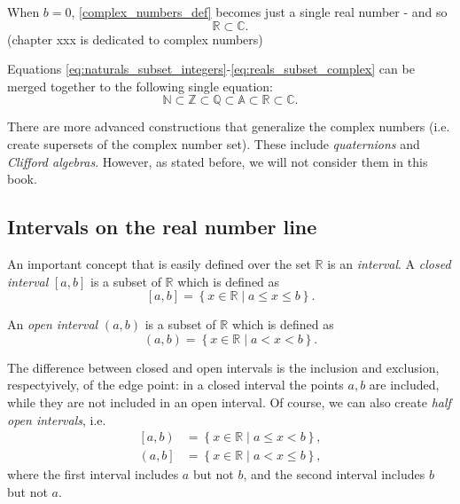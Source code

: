 When $b=0$, \eqref{complex_numbers_def} becomes just a single real number - and so
\begin{equation}
	\mathbb{R}\subset\mathbb{C}.
	\label{eq:reals_subset_complex}
\end{equation}
(chapter xxx is dedicated to complex numbers)

Equations \ref{eq:naturals_subset_integers}-\ref{eq:reals_subset_complex} can be merged together to the following single equation:
\begin{equation}
	\mathbb{N} \subset \mathbb{Z} \subset \mathbb{Q} \subset \mathbb{A} \subset \mathbb{R} \subset \mathbb{C}.
	\label{eq:numbers_subsets}
\end{equation}

There are more advanced constructions that generalize the complex numbers (i.e. create supersets of the complex number set). These include \emph{quaternions} and \emph{Clifford algebras}. However, as stated before, we will not consider them in this book.

\subsection{Intervals on the real number line}
An important concept that is easily defined over the set $\mathbb{R}$ is an \emph{interval}. A \emph{closed interval} $\left[ a,b \right]$ is a subset of $\mathbb{R}$ which is defined as
\begin{equation}
	\left[ a,b \right] = \left\{ x\in\mathbb{R} \mid a\leq x\leq b \right\}.
	\label{eq:closed_interval}
\end{equation}

An \emph{open interval} $\left( a,b \right)$ is a subset of $\mathbb{R}$ which is defined as
\begin{equation}
	\left( a,b \right) = \left\{ x\in\mathbb{R} \mid a<x<b \right\}.
	\label{eq:open_interval}
\end{equation}

The difference between closed and open intervals is the inclusion and exclusion, respectyively, of the edge point: in a closed interval the points $a,b$ are included, while they are not included in an open interval. Of course, we can also create \emph{half open intervals}, i.e.
\begin{align}
	\left[ a,b \right) &= \left\{ x\in\mathbb{R} \mid a\leq x < b \right\},\nonumber\\
	\left( a,b \right] &= \left\{ x\in\mathbb{R} \mid a < x\leq b \right\},
	\label{eq:half_open_intervals}
\end{align}
where the first interval includes $a$ but not $b$, and the second interval includes $b$ but not $a$.

